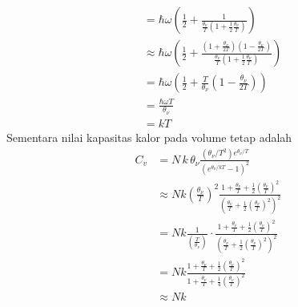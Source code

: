 \documentclass[a4paper , 12 pt]{article}
\begin{document}
\begin{enumerate}
\begin{enumerate}
\begin{align}
 & = \hbar \omega \left( \frac{1}{2} + \frac{1}{\frac{\theta_\nu}{T} \left(1+ \frac{1}{2}\frac{\theta_\nu}{T}\right)}\right) \nonumber \\
 & \approx \hbar \omega \left( \frac{1}{2} + \frac{ (1+  \frac{\theta_\nu}{2T})(1 -   \frac{\theta_\nu}{2T})}{\frac{\theta_\nu}{T} \left(1+ \frac{1}{2}\frac{\theta_\nu}{T}\right)} \right) \nonumber \\
 & = \hbar \omega \left( \frac{1}{2} + \frac{T}{\theta_\nu} \left(1 - \frac{\theta_\nu }{2 T}\right)\right) \nonumber \\
 & = \frac{\hbar \omega T}{\theta_\nu} \nonumber \\
 & = k T \nonumber
\end{align}
Sementara nilai kapasitas kalor pada volume tetap adalah
\begin{align}
 C_v & = N\,k \, \theta_\nu  \frac{(\theta_\nu/T^2) e^{\theta_\nu/ T}}{(e^{\theta_\nu/kT} - 1)^2} \nonumber \\
 & \approx Nk \left( \frac{\theta_\nu}{T}\right)^2 \frac{1 + \frac{\theta_\nu}{T}+ \frac{1}{2}\left(\frac{\theta_\nu}{T}\right)^2}{\left(\frac{\theta_\nu}{T} + \frac{1}{2} \left(\frac{\theta_\nu}{T}\right)^2 \right)^2} \nonumber \\
 & = Nk \frac{1}{\left(\frac{T}{\theta_\nu}\right)}\cdot \frac{1 + \frac{\theta_\nu}{T}+ \frac{1}{2}\left(\frac{\theta_\nu}{T}\right)^2}{\left(\frac{\theta_\nu}{T} + \frac{1}{2} \left(\frac{\theta_\nu}{T}\right)^2 \right)^2} \nonumber  \\
 & = N k \frac{1 + \frac{\theta_\nu}{T}+ \frac{1}{2}\left(\frac{\theta_\nu}{T}\right)^2}{1 + \frac{\theta_\nu}{T}+ \frac{1}{4}\left(\frac{\theta_\nu}{T}\right)^2} \nonumber \\
 &  \approx Nk  \nonumber
\end{align}
\end{enumerate}
\end{enumerate}
\end{document}
